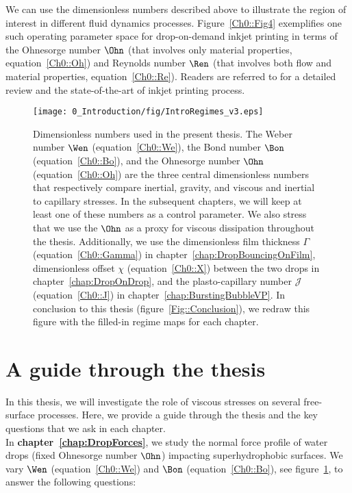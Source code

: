 We can use the dimensionless numbers described above to illustrate the region of interest in different fluid dynamics processes. Figure~\ref{Ch0::Fig4} exemplifies one such operating parameter space for drop-on-demand inkjet printing in terms of the Ohnesorge number $\Ohn$ (that involves only material properties, equation~\eqref{Ch0::Oh}) and Reynolds number $\Ren$ (that involves both flow and material properties, equation~\eqref{Ch0::Re}). Readers are referred to \citet{lohse2022fundamental} for a detailed review and the state-of-the-art of inkjet printing process.

\begin{sidewaysfigure}
	\centering
	\texttt{[image: 0\_Introduction/fig/IntroRegimes\_v3.eps]}	
	\caption{Dimensionless numbers used in the present thesis. The Weber number $\Wen$ (equation~\eqref{Ch0::We}), the Bond number $\Bon$ (equation~\eqref{Ch0::Bo}), and the Ohnesorge number $\Ohn$ (equation~\eqref{Ch0::Oh}) are the three central dimensionless numbers that respectively compare inertial, gravity, and viscous and inertial to capillary stresses. In the subsequent chapters, we will keep at least one of these numbers as a control parameter. We also stress that we use the $\Ohn$ as a proxy for viscous dissipation throughout the thesis. Additionally, we use the dimensionless film thickness $\Gamma$ (equation~\eqref{Ch0::Gamma}) in chapter~\ref{chap:DropBouncingOnFilm}, dimensionless offset $\chi$ (equation~\eqref{Ch0::X}) between the two drops in chapter~\ref{chap:DropOnDrop}, and the plasto-capillary number $\mathcal{J}$ (equation~\eqref{Ch0::J}) in chapter~\ref{chap:BurstingBubbleVP}. In conclusion to this thesis (figure~\ref{Fig::Conclusion}), we redraw this figure with the filled-in regime maps for each chapter.}
	\label{Fig::IntroRegimeMap}
\end{sidewaysfigure}

\section*{A guide through the thesis}

In this thesis, we will investigate the role of viscous stresses on several free-surface processes. Here, we provide a guide through the thesis and the key questions that we ask in each chapter.\\

In \textbf{chapter~\ref{chap:DropForces}}, we study the normal force profile of water drops (fixed Ohnesorge number $\Ohn$) impacting superhydrophobic surfaces. We vary $\Wen$ (equation~\eqref{Ch0::We}) and $\Bon$ (equation~\eqref{Ch0::Bo}), see figure~\ref{Fig::IntroRegimeMap}, to answer the following questions:\vspace{1.25mm}

